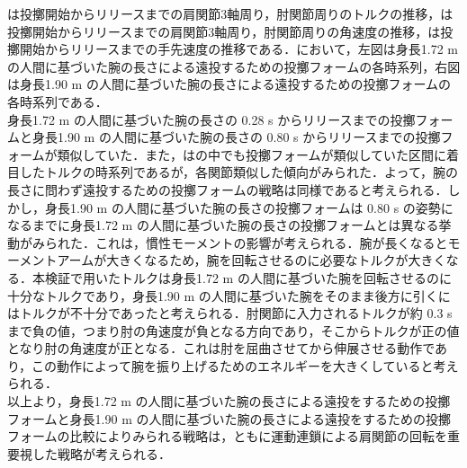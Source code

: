 は投擲開始からリリースまでの肩関節3軸周り，肘関節周りのトルクの推移，は投擲開始からリリースまでの肩関節3軸周り，肘関節周りの角速度の推移，は投擲開始からリリースまでの手先速度の推移である．において，左図は身長1.72 m の人間に基づいた腕の長さによる遠投するための投擲フォームの各時系列，右図は身長1.90 m の人間に基づいた腕の長さによる遠投するための投擲フォームの各時系列である．\\
身長1.72 m の人間に基づいた腕の長さの 0.28 s からリリースまでの投擲フォームと身長1.90 m の人間に基づいた腕の長さの 0.80 s からリリースまでの投擲フォームが類似していた．また，はの中でも投擲フォームが類似していた区間に着目したトルクの時系列であるが，各関節類似した傾向がみられた．よって，腕の長さに問わず遠投するための投擲フォームの戦略は同様であると考えられる．しかし，身長1.90 m の人間に基づいた腕の長さの投擲フォームは 0.80 s の姿勢になるまでに身長1.72 m の人間に基づいた腕の長さの投擲フォームとは異なる挙動がみられた．これは，慣性モーメントの影響が考えられる．腕が長くなるとモーメントアームが大きくなるため，腕を回転させるのに必要なトルクが大きくなる．本検証で用いたトルクは身長1.72 m の人間に基づいた腕を回転させるのに十分なトルクであり，身長1.90 m の人間に基づいた腕をそのまま後方に引くにはトルクが不十分であったと考えられる．肘関節に入力されるトルクが約 0.3 s まで負の値，つまり肘の角速度が負となる方向であり，そこからトルクが正の値となり肘の角速度が正となる．これは肘を屈曲させてから伸展させる動作であり，この動作によって腕を振り上げるためのエネルギーを大きくしていると考えられる．\\
以上より，身長1.72 m の人間に基づいた腕の長さによる遠投をするための投擲フォームと身長1.90 m の人間に基づいた腕の長さによる遠投をするための投擲フォームの比較によりみられる戦略は，ともに運動連鎖による肩関節の回転を重要視した戦略が考えられる．

\clearpage
{}
